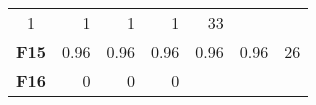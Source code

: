 \documentclass[12pt,a4paper]{article}
\begin{document}
\begin{longtable}[c]{@{}crrrrrr@{}}
\begin{minipage}[t]{0.08\columnwidth}
1
\strut\end{minipage} &
\begin{minipage}[t]{0.09\columnwidth}\raggedleft\strut
1
\strut\end{minipage} &
\begin{minipage}[t]{0.10\columnwidth}\raggedleft\strut
1
\strut\end{minipage} &
\begin{minipage}[t]{0.11\columnwidth}\raggedleft\strut
1
\strut\end{minipage} &
\begin{minipage}[t]{0.07\columnwidth}\raggedleft\strut
33
\strut\end{minipage}\tabularnewline
\begin{minipage}[t]{0.11\columnwidth}\centering\strut
\textbf{F15}
\strut\end{minipage} &
\begin{minipage}[t]{0.07\columnwidth}\raggedleft\strut
0.96
\strut\end{minipage} &
\begin{minipage}[t]{0.08\columnwidth}\raggedleft\strut
0.96
\strut\end{minipage} &
\begin{minipage}[t]{0.09\columnwidth}\raggedleft\strut
0.96
\strut\end{minipage} &
\begin{minipage}[t]{0.10\columnwidth}\raggedleft\strut
0.96
\strut\end{minipage} &
\begin{minipage}[t]{0.11\columnwidth}\raggedleft\strut
0.96
\strut\end{minipage} &
\begin{minipage}[t]{0.07\columnwidth}\raggedleft\strut
26
\strut\end{minipage}\tabularnewline
\begin{minipage}[t]{0.11\columnwidth}\centering\strut
\textbf{F16}
\strut\end{minipage} &
\begin{minipage}[t]{0.07\columnwidth}\raggedleft\strut
0
\strut\end{minipage} &
\begin{minipage}[t]{0.08\columnwidth}\raggedleft\strut
0
\strut\end{minipage} &
\begin{minipage}[t]{0.09\columnwidth}\raggedleft\strut
0
\strut\end{minipage} &
\begin{minipage}[t]{0.10\columnwidth}\raggedleft\strut

\end{minipage}
\end{longtable}
\end{document}
